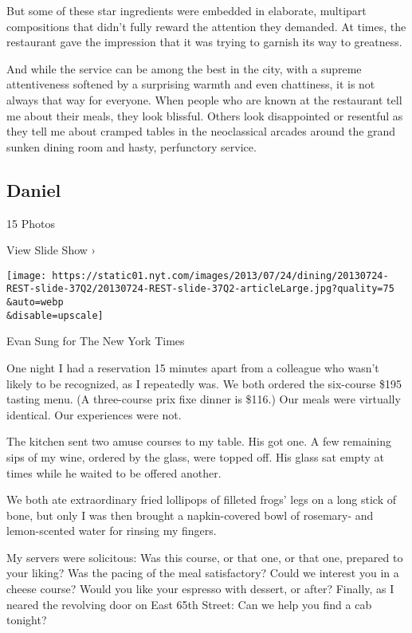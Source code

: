 But some of these star ingredients were embedded in elaborate, multipart
compositions that didn't fully reward the attention they demanded. At
times, the restaurant gave the impression that it was trying to garnish
its way to greatness.

And while the service can be among the best in the city, with a supreme
attentiveness softened by a surprising warmth and even chattiness, it is
not always that way for everyone. When people who are known at the
restaurant tell me about their meals, they look blissful. Others look
disappointed or resentful as they tell me about cramped tables in the
neoclassical arcades around the grand sunken dining room and hasty,
perfunctory service.

\href{https://www.nytimes.com/slideshow/2013/07/24/dining/20130724-REST.html}{}

\hypertarget{daniel}{%
\subsection{Daniel}\label{daniel}}

15 Photos

View Slide Show ›

\texttt{[image: https://static01.nyt.com/images/2013/07/24/dining/20130724-REST-slide-37Q2/20130724-REST-slide-37Q2-articleLarge.jpg?quality=75\\\&auto=webp\\\&disable=upscale]}

Evan Sung for The New York Times

One night I had a reservation 15 minutes apart from a colleague who
wasn't likely to be recognized, as I repeatedly was. We both ordered the
six-course \$195 tasting menu. (A three-course prix fixe dinner is
\$116.) Our meals were virtually identical. Our experiences were not.

The kitchen sent two amuse courses to my table. His got one. A few
remaining sips of my wine, ordered by the glass, were topped off. His
glass sat empty at times while he waited to be offered another.

We both ate extraordinary fried lollipops of filleted frogs' legs on a
long stick of bone, but only I was then brought a napkin-covered bowl of
rosemary- and lemon-scented water for rinsing my fingers.

My servers were solicitous: Was this course, or that one, or that one,
prepared to your liking? Was the pacing of the meal satisfactory? Could
we interest you in a cheese course? Would you like your espresso with
dessert, or after? Finally, as I neared the revolving door on East 65th
Street: Can we help you find a cab tonight?


